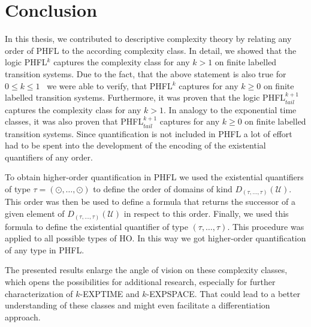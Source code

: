\chapter{Conclusion}

In this thesis, we contributed to descriptive complexity theory by relating any order of PHFL to the according complexity class. In detail, we showed that the logic PHFL$^k$ captures the complexity class  for any $k > 1$ on finite labelled transition systems. Due to the fact, that the above statement is also true for $0 \leq k \leq 1$~\cite{lange2014capturing} we were able to verify, that PHFL$^k$ captures  for any $k \geq 0$ on finite labelled transition systems. Furthermore, it was proven that the logic PHFL$^{k+1}_{tail}$ captures the complexity class  for any $k > 1$. In analogy to the exponential time classes, it was also proven that PHFL$^{k+1}_{tail}$ captures  for any $k \geq 0$ on finite labelled transition systems.
Since quantification is not included in PHFL a lot of effort had to be spent into the development of the encoding of the existential quantifiers of any order.

To obtain higher-order quantification in PHFL we used the existential quantifiers of type $\tau = (\odot, \dots, \odot)$ to define the order of domains of kind
$D_{(\tau, \dots, \tau)}(\mathcal{U})$. This order was then be used to define a formula that returns the successor
of a given element of $D_{(\tau, \dots, \tau)}(\mathcal{U})$ in respect to this order. Finally, we used this
formula to define the existential quantifier of type $(\tau, \dots, \tau)$. This procedure was applied to all
possible types of HO. In this way we got higher-order quantification of any type in PHFL.

The presented results enlarge the angle of vision on these complexity classes, which opens the possibilities for additional research, especially for further characterization of $k$-EXPTIME and $k$-EXPSPACE. That could lead to a better understanding of these classes and might even facilitate a differentiation approach.
